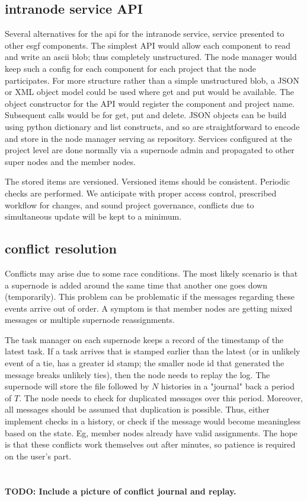 \documentclass[oneside,12pt]{memoir}
\begin{document}
\subsection{intranode service API}

Several alternatives for the api for the intranode service, service presented to other esgf components.   The simplest API would allow each component to read and write an ascii blob; thus completely unstructured.  The node manager would keep such a config for each component for each project that the node participates.  For more structure rather than a simple unstructured blob, a JSON or XML object model could be used where get and put would be available.   The object constructor for the API would register the component and project name.  Subsequent calls would be for get, put and delete.  JSON objects can be build using python dictionary and list constructs, and so are straightforward to encode and store in the node manager serving as repository.   Services configured at the project level are done normally via a supernode admin and propagated to other super nodes and the member nodes.

The stored items are versioned.  Versioned items should be consistent.  Periodic checks are performed.  We anticipate with proper access control, prescribed workflow for changes, and sound project governance, conflicts due to simultaneous update will be kept to a minimum.

\subsection{conflict resolution}

Conflicts may arise due to some race conditions.  The most likely scenario is that a supernode is added around the same time that another one goes down (temporarily).    This problem can be problematic if the messages regarding these events arrive out of order.  A symptom is that member nodes are getting mixed messages or multiple supernode reassignments.

  The task manager on each supernode keeps a record of the timestamp of the latest task.  If a task arrives that is stamped earlier than the latest (or in unlikely event of a tie, has a greater id stamp; the smaller node id that generated the message breaks unlikely ties), then the node needs to replay the log. 
  The supernode will store the file followed by $N$ histories in a "journal" back a period of $T$.  
    The node needs to check for duplicated messages over this period.  Moreover, all messages should be assumed that duplication is possible.  Thus, either implement checks in a history, or check if the message would become meaningless based on the state.  Eg, member nodes already have valid assignments.   The hope is that these conflicts work themselves out after minutes, so patience is required on the user's part. \\
\\
\\
\textbf{ TODO: Include a picture of conflict journal and replay.}
\end{document}
